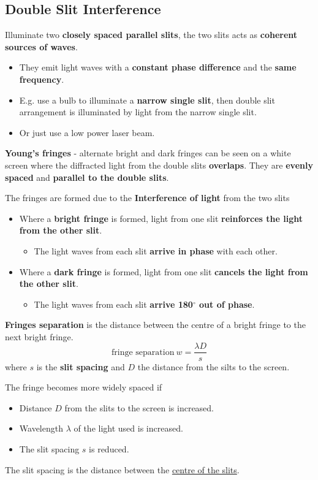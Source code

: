 \subsection{Double Slit Interference}

Illuminate two \textbf{closely spaced parallel slits}, the two slits acts as \textbf{coherent sources of waves}.
\begin{itemize}
    \item They emit light waves with a \textbf{constant phase difference} and the \textbf{same frequency}.
    \item E.g. use a bulb to illuminate a \textbf{narrow single slit}, then double slit arrangement is illuminated by light from the narrow single slit.
    \item Or just use a low power laser beam.
\end{itemize}

\textbf{Young's fringes} - alternate bright and dark fringes can be seen on a white screen where the diffracted light from the double slits \textbf{overlaps}. They are \textbf{evenly spaced} and \textbf{parallel to the double slits}.

The fringes are formed due to the \textbf{Interference of light} from the two slits
\begin{itemize}
    \item Where a \textbf{bright fringe} is formed, light from one slit \textbf{reinforces the light from the other slit}.
        \begin{itemize}
            \item The light waves from each slit \textbf{arrive in phase} with each other.
        \end{itemize}
    \item Where a \textbf{dark fringe} is formed, light from one slit \textbf{cancels the light from the other slit}.
        \begin{itemize}
            \item The light waves from each slit \textbf{arrive 180$^\circ$ out of phase}.
        \end{itemize}
\end{itemize}

\textbf{Fringes separation} is the distance between the centre of a bright fringe to the next bright fringe.
$$\text{fringe separation}\ w=\frac{\lambda D}{s}$$
where $s$ is the \textbf{slit spacing} and $D$ the distance from the silts to the screen.

The fringe becomes more widely spaced if
\begin{itemize}
    \item Distance $D$ from the slits to the screen is increased.
    \item Wavelength $\lambda$ of the light used is increased.
    \item The slit spacing $s$ is reduced.
\end{itemize}
The slit spacing is the distance between the \underline{centre of the slits}.

